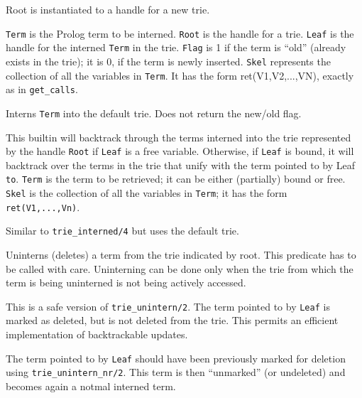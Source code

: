 \begin{description}
 
	Root is instantiated to a handle for a new trie.

{\tt Term} is the Prolog term to be interned. {\tt Root} is the handle for
a trie. {\tt Leaf} is the handle for the interned {\tt Term} in the trie.
{\tt Flag} is 1 if the term is ``old'' (already exists in the trie); it is
0, if the term is newly inserted.  {\tt Skel} represents the collection of
all the variables in {\tt Term}. It has the form ret(V1,V2,...,VN), exactly
as in {\tt get\_calls}.


Interns {\tt Term} into the default trie. Does not return the new/old flag.


This builtin will backtrack through the terms interned into the trie
represented by the handle {\tt Root} if {\tt Leaf} is a free variable.
Otherwise, if {\tt Leaf} is bound, it will backtrack over the terms in the
trie that unify with the term pointed to by Leaf {\tt to}.  {\tt Term} is
the term to be retrieved; it can be either (partially) bound or free.  {\tt
  Skel} is the collection of all the variables in {\tt Term}; it has the
form {\tt ret(V1,...,Vn)}.

 
Similar to {\tt trie\_interned/4}  but uses the default trie.


 
Uninterns (deletes) a term from the trie indicated by root.  This predicate
has to be called with care. Uninterning can be done only when the trie from
which the term is being uninterned is not being actively accessed.

This is a safe version of {\tt trie\_unintern/2}. The term pointed to by
{\tt Leaf} is marked as deleted, but is not deleted from the trie. This
permits an efficient implementation of backtrackable updates.

The term pointed to by {\tt Leaf} should have been previously marked for
deletion using
{\tt trie\_unintern\_nr/2}. This term is then ``unmarked'' (or undeleted)
and becomes again a notmal interned term.


\end{description}

